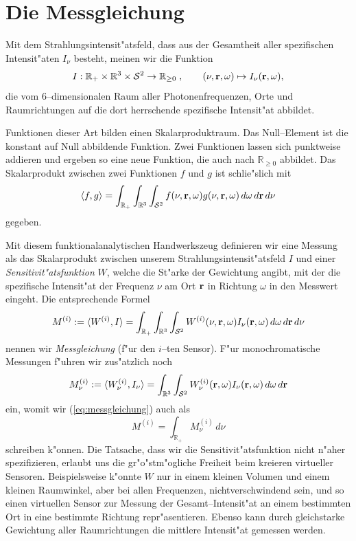 	
	\section{Die Messgleichung}\label{sec:measurement_equation}
	Mit dem Strahlungsintensit"atsfeld, dass aus der Gesamtheit aller spezifischen Intensit"aten $I_\nu$ besteht, meinen wir die Funktion
	$$I:\mathbb{R}_+\times\mathbb{R}^3\times\mathcal{S}^2\to\mathbb{R}_{\geq 0}\;,\qquad (\nu,\mathbf{r},\omega)\mapsto I_\nu(\mathbf{r},\omega),$$
	die vom 6--dimensionalen Raum aller Photonenfrequenzen, Orte und Raumrichtungen auf die dort herrschende spezifische Intensit"at abbildet.
	
	Funktionen dieser Art bilden einen Skalarproduktraum. Das Null--Element ist die konstant auf Null abbildende Funktion. Zwei Funktionen lassen sich punktweise addieren und ergeben so eine neue Funktion, die auch nach $\mathbb{R}_{\geq 0}$ abbildet. Das Skalarprodukt zwischen zwei Funktionen $f$ und $g$ ist schlie"slich mit
	$$\langle f,g\rangle=\int_{\mathbb{R}_+} \int_{\mathbb{R}^3} \int_{\mathcal{S}^2} f(\nu,\mathbf{r},\omega)g(\nu,\mathbf{r},\omega)\,d\omega\,d\mathbf{r}\,d\nu$$
	gegeben.
	
	Mit diesem funktionalanalytischen Handwerkszeug definieren wir eine Messung als das Skalarprodukt zwischen unserem Strahlungsintensit"atsfeld $I$ und einer {\em Sensitivit"atsfunktion} $W$, welche die St"arke der Gewichtung angibt, mit der die spezifische Intensit"at der Frequenz $\nu$ am Ort $\mathbf{r}$ in Richtung $\omega$ in den Messwert eingeht. Die entsprechende Formel
	\begin{equation}\label{eq:messgleichung}
		M^{(i)}:=\langle W^{(i)},I\rangle=\int_{\mathbb{R}_+} \int_{\mathbb{R}^3} \int_{\mathcal{S}^2} W^{(i)}(\nu,\mathbf{r},\omega)I_\nu(\mathbf{r},\omega)\,d\omega\,d\mathbf{r}\,d\nu
	\end{equation}
	nennen wir {\em Messgleichung} (f"ur den $i$--ten Sensor). F"ur monochromatische Messungen f"uhren wir zus"atzlich noch 
	\begin{equation}\label{eq:messgleichung_mono}
		M_\nu^{(i)}:=\langle W_\nu^{(i)},I_\nu\rangle=\int_{\mathbb{R}^3} \int_{\mathcal{S}^2} W_\nu^{(i)}(\mathbf{r},\omega)I_\nu(\mathbf{r},\omega)\,d\omega\,d\mathbf{r}
	\end{equation}
	ein, womit wir (\ref{eq:messgleichung}) auch als
	\begin{equation}\label{eq:messgleichung_frommonos}
		M^{(i)}=\int_{\mathbb{R}_+} M_\nu^{(i)}\,d\nu
	\end{equation}
	schreiben k"onnen.
	Die Tatsache, dass wir die Sensitivit"atsfunktion nicht n"aher spezifizieren, erlaubt uns die gr"o"stm"ogliche Freiheit beim kreieren virtueller Sensoren. Beispielsweise k"onnte $W$ nur in einem kleinen Volumen und einem kleinen Raumwinkel, aber bei allen Frequenzen, nichtverschwindend sein, und so einen virtuellen Sensor zur Messung der Gesamt--Intensit"at an einem bestimmten Ort in eine bestimmte Richtung repr"asentieren. Ebenso kann durch gleichstarke Gewichtung aller Raumrichtungen die mittlere Intensit"at gemessen werden.
	
